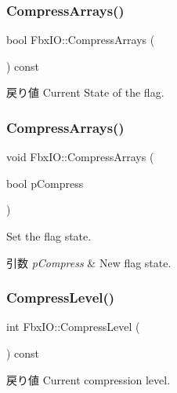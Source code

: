 \subsubsection{\texorpdfstring{Compress\+Arrays()}{CompressArrays()}\hspace{0.1cm}{\footnotesize\ttfamily [1/2]}}
{\footnotesize\ttfamily bool Fbx\+I\+O\+::\+Compress\+Arrays (\begin{DoxyParamCaption}{ }\end{DoxyParamCaption}) const}

\begin{DoxyReturn}{戻り値}
Current State of the flag. 
\end{DoxyReturn}
\mbox{\label{class_fbx_i_o_a79a44fb21056b562e7a5829c4a00a228}} 
\subsubsection{\texorpdfstring{Compress\+Arrays()}{CompressArrays()}\hspace{0.1cm}{\footnotesize\ttfamily [2/2]}}
{\footnotesize\ttfamily void Fbx\+I\+O\+::\+Compress\+Arrays (\begin{DoxyParamCaption}\item[{bool}]{p\+Compress }\end{DoxyParamCaption})}

Set the flag state. 
\begin{DoxyParams}{引数}
{\em p\+Compress} & New flag state. \\
\hline
\end{DoxyParams}
\mbox{\label{class_fbx_i_o_a6d8e6a96dbea9478c5816ab72cca55a2}} 
\subsubsection{\texorpdfstring{Compress\+Level()}{CompressLevel()}\hspace{0.1cm}{\footnotesize\ttfamily [1/2]}}
{\footnotesize\ttfamily int Fbx\+I\+O\+::\+Compress\+Level (\begin{DoxyParamCaption}{ }\end{DoxyParamCaption}) const}

\begin{DoxyReturn}{戻り値}
Current compression level. 
\end{DoxyReturn}
\mbox{\label{class_fbx_i_o_aafc916c10c65b2a303ef85e17bed810c}} 
